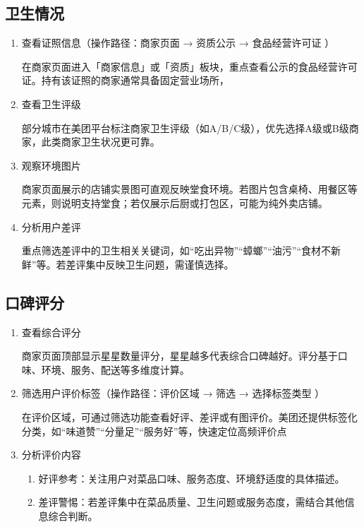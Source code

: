 \documentclass{amznotes}
\begin{document}
\subsection{卫生情况}
\begin{enumerate}
  \item 查看证照信息（操作路径：商家页面 → 资质公示 → 食品经营许可证 ）

  在商家页面进入「商家信息」或「资质」板块，重点查看公示的食品经营许可证。持有该证照的商家通常具备固定营业场所，

  \item 查看卫生评级

  部分城市在美团平台标注商家卫生评级（如A/B/C级），优先选择A级或B级商家，此类商家卫生状况更可靠。

  \item 观察环境图片

  商家页面展示的店铺实景图可直观反映堂食环境。若图片包含桌椅、用餐区等元素，则说明支持堂食；若仅展示后厨或打包区，可能为纯外卖店铺。

  \item 分析用户差评

  重点筛选差评中的卫生相关关键词，如“吃出异物”“蟑螂”“油污”“食材不新鲜”等。若差评集中反映卫生问题，需谨慎选择。

\end{enumerate}
\subsection{口碑评分}
\begin{enumerate}
  \item 查看综合评分

  商家页面顶部显示星星数量评分，星星越多代表综合口碑越好。评分基于口味、环境、服务、配送等多维度计算。

  \item  筛选用户评价标签（操作路径：评价区域 → 筛选 → 选择标签类型 ）

  在评价区域，可通过筛选功能查看好评、差评或有图评价。美团还提供标签化分类，如“味道赞”“分量足”“服务好”等，快速定位高频评价点

 \item  分析评价内容

  \begin{enumerate}
    \item 好评参考：关注用户对菜品口味、服务态度、环境舒适度的具体描述。
    \item 差评警惕：若差评集中在菜品质量、卫生问题或服务态度，需结合其他信息综合判断。
  \end{enumerate}
\end{enumerate}
\end{document}
